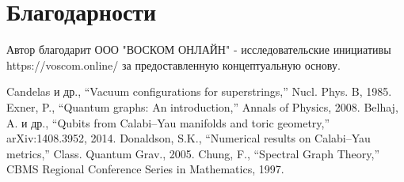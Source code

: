 \documentclass[12pt,a4paper]{article}
\begin{document}
\section*{Благодарности}
Автор благодарит ООО "ВОСКОМ ОНЛАЙН" - исследовательские инициативы  https://voscom.online/
за предоставленную концептуальную основу.

\begin{thebibliography}{9}
Candelas и др., ``Vacuum configurations for superstrings,'' 
Nucl. Phys. B, 1985.
Exner, P., ``Quantum graphs: An introduction,'' 
Annals of Physics, 2008.
Belhaj, A. и др., ``Qubits from Calabi--Yau manifolds and toric geometry,'' 
arXiv:1408.3952, 2014.
Donaldson, S.K., ``Numerical results on Calabi--Yau metrics,'' 
Class. Quantum Grav., 2005.
Chung, F., ``Spectral Graph Theory,'' 
CBMS Regional Conference Series in Mathematics, 1997.
\end{thebibliography}
\end{document}
